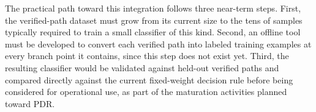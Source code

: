 The practical path toward this integration follows three near-term steps. First, the verified-path dataset must grow from its current size to the tens of samples typically required to train a small classifier of this kind. Second, an offline tool must be developed to convert each verified path into labeled training examples at every branch point it contains, since this step does not exist yet. Third, the resulting classifier would be validated against held-out verified paths and compared directly against the current fixed-weight decision rule before being considered for operational use, as part of the maturation activities planned toward PDR.
